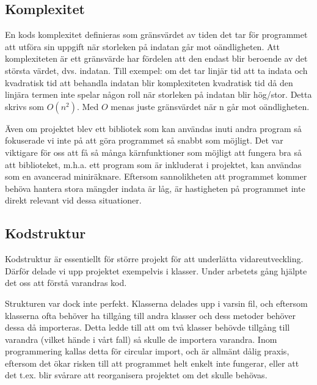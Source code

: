 \documentclass[12pt,a4paper]{article}
\begin{document}
\subsection{Komplexitet}
\label{subsec:Komplexitet}
En kods komplexitet definieras som gränsvärdet av tiden det tar för programmet att utföra sin uppgift när storleken på indatan går mot oändligheten. Att komplexiteten är ett gränsvärde har fördelen att den endast blir beroende av det största värdet, dvs. indatan. Till exempel: om det tar linjär tid att ta indata och kvadratisk tid att behandla indatan blir komplexiteten kvadratisk tid då den linjära termen inte spelar någon roll när storleken på indatan blir hög/stor. Detta skrivs som \(O(n^2)\). Med \(O\) menas juste gränsvärdet när n går mot oändligheten.
\par
Även om projektet blev ett bibliotek som kan användas inuti andra program så fokuserade vi inte på att göra programmet så snabbt som möjligt. Det var viktigare för oss att få så många kärnfunktioner som möjligt att fungera bra så att biblioteket, m.h.a. ett program som är inkluderat i projektet, kan användas som en avancerad miniräknare. Eftersom sannolikheten att programmet kommer behöva hantera stora mängder indata är låg, är hastigheten på programmet inte direkt relevant vid dessa situationer. 
\subsection{Kodstruktur}
Kodstruktur är essentiellt för större projekt för att underlätta vidareutveckling. Därför delade vi upp projektet exempelvis i klasser. Under arbetets gång hjälpte det oss att förstå varandras kod.
\par
Strukturen var dock inte perfekt. Klasserna delades upp i varsin fil, och eftersom klasserna ofta behöver ha tillgång till andra klasser och dess metoder behöver dessa då importeras. Detta ledde till att om två klasser behövde tillgång till varandra (vilket hände i vårt fall) så skulle de importera varandra. Inom programmering kallas detta för circular import, och är allmänt dålig praxis, eftersom det ökar risken till att programmet helt enkelt inte fungerar, eller att det t.ex. blir svårare att reorganisera projektet om det skulle behövas.
\end{document}
